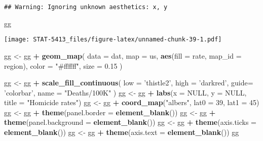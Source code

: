 \documentclass[]{book}
\newenvironment{Shaded}{\begin{snugshade}}{\end{snugshade}}
\newcommand{\DataTypeTok}[1]{\textcolor[rgb]{0.13,0.29,0.53}{#1}}
\newcommand{\DecValTok}[1]{\textcolor[rgb]{0.00,0.00,0.81}{#1}}
\newcommand{\FloatTok}[1]{\textcolor[rgb]{0.00,0.00,0.81}{#1}}
\newcommand{\KeywordTok}[1]{\textcolor[rgb]{0.13,0.29,0.53}{\textbf{#1}}}
\newcommand{\NormalTok}[1]{#1}
\newcommand{\OperatorTok}[1]{\textcolor[rgb]{0.81,0.36,0.00}{\textbf{#1}}}
\newcommand{\OtherTok}[1]{\textcolor[rgb]{0.56,0.35,0.01}{#1}}
\newcommand{\StringTok}[1]{\textcolor[rgb]{0.31,0.60,0.02}{#1}}
\begin{document}
\begin{verbatim}
## Warning: Ignoring unknown aesthetics: x, y
\end{verbatim}

\begin{Shaded}
\begin{Highlighting}[]
\NormalTok{gg}
\end{Highlighting}
\end{Shaded}

\texttt{[image: STAT-5413\_files/figure-latex/unnamed-chunk-39-1.pdf]}

\begin{Shaded}
\begin{Highlighting}[]
\NormalTok{gg <-}\StringTok{ }\NormalTok{gg }\OperatorTok{+}\StringTok{ }\KeywordTok{geom_map}\NormalTok{(}
    \DataTypeTok{data =}\NormalTok{ dat, }
    \DataTypeTok{map =}\NormalTok{ us,}
    \KeywordTok{aes}\NormalTok{(}\DataTypeTok{fill =}\NormalTok{ rate, }\DataTypeTok{map_id =}\NormalTok{ region),}
    \DataTypeTok{color =} \StringTok{"#ffffff"}\NormalTok{, }\DataTypeTok{size =} \FloatTok{0.15}
\NormalTok{)}

\NormalTok{gg <-}\StringTok{ }\NormalTok{gg }\OperatorTok{+}\StringTok{ }\KeywordTok{scale_fill_continuous}\NormalTok{(}
    \DataTypeTok{low  =} \StringTok{'thistle2'}\NormalTok{, }
    \DataTypeTok{high =} \StringTok{'darkred'}\NormalTok{, }
    \DataTypeTok{guide=} \StringTok{'colorbar'}\NormalTok{,}
    \DataTypeTok{name =} \StringTok{"Deaths/100K"}
\NormalTok{)}
\NormalTok{gg <-}\StringTok{ }\NormalTok{gg }\OperatorTok{+}\StringTok{ }\KeywordTok{labs}\NormalTok{(}\DataTypeTok{x =} \OtherTok{NULL}\NormalTok{, }\DataTypeTok{y =} \OtherTok{NULL}\NormalTok{, }\DataTypeTok{title =} \StringTok{"Homicide rates"}\NormalTok{)}
\NormalTok{gg <-}\StringTok{ }\NormalTok{gg }\OperatorTok{+}\StringTok{ }\KeywordTok{coord_map}\NormalTok{(}\StringTok{"albers"}\NormalTok{, }\DataTypeTok{lat0 =} \DecValTok{39}\NormalTok{, }\DataTypeTok{lat1 =} \DecValTok{45}\NormalTok{) }
\NormalTok{gg <-}\StringTok{ }\NormalTok{gg }\OperatorTok{+}\StringTok{ }\KeywordTok{theme}\NormalTok{(}\DataTypeTok{panel.border =} \KeywordTok{element_blank}\NormalTok{())}
\NormalTok{gg <-}\StringTok{ }\NormalTok{gg }\OperatorTok{+}\StringTok{ }\KeywordTok{theme}\NormalTok{(}\DataTypeTok{panel.background =} \KeywordTok{element_blank}\NormalTok{())}
\NormalTok{gg <-}\StringTok{ }\NormalTok{gg }\OperatorTok{+}\StringTok{ }\KeywordTok{theme}\NormalTok{(}\DataTypeTok{axis.ticks =} \KeywordTok{element_blank}\NormalTok{())}
\NormalTok{gg <-}\StringTok{ }\NormalTok{gg }\OperatorTok{+}\StringTok{ }\KeywordTok{theme}\NormalTok{(}\DataTypeTok{axis.text =} \KeywordTok{element_blank}\NormalTok{())}
\NormalTok{gg}
\end{Highlighting}
\end{Shaded}
\end{document}
